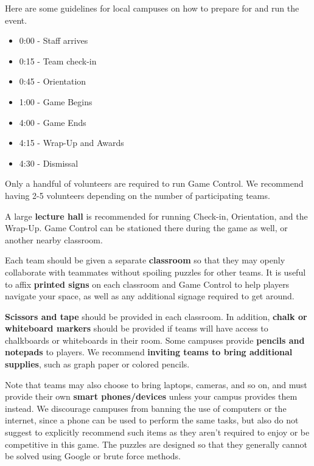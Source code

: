 Here are some guidelines for local campuses on how to prepare for and
run the event.


\begin{itemize}
  \item 0:00 - Staff arrives
  \item 0:15 - Team check-in
  \item 0:45 - Orientation
  \item 1:00 - Game Begins
  \item 4:00 - Game Ends
  \item 4:15 - Wrap-Up and Awards
  \item 4:30 - Dismissal
\end{itemize}


Only a handful of volunteers are required to run Game Control. We recommend
having 2-5 volunteers depending on the number of participating teams.


A large \textbf{lecture hall} is recommended for running Check-in,
Orientation, and the Wrap-Up. Game Control can be stationed there during
the game as well, or another nearby classroom.

Each team should be given a separate \textbf{classroom} so that they may
openly collaborate with teammates without spoiling puzzles for other teams.
It is useful to affix \textbf{printed signs} on each classroom and Game
Control to help players navigate your space, as well as any additional
signage required to get around.


\textbf{Scissors and tape} should be provided in each classroom.
In addition, \textbf{chalk or whiteboard markers} should be provided if
teams will have access to chalkboards or whiteboards in their room.
Some campuses provide \textbf{pencils and notepads} to players.
We recommend \textbf{inviting teams to bring additional supplies}, such as
graph paper or colored pencils.

Note that teams may also choose to bring laptops, cameras,
and so on, and must provide their own \textbf{smart phones/devices}
unless your campus provides them instead. 
We discourage campuses from banning the use of computers or the internet,
since a phone can be used to perform the same tasks, but also
do not suggest to explicitly recommend such items as they aren't required
to enjoy or be competitive in this game. The puzzles are
designed so that they generally cannot be solved using Google or 
brute force methods.

